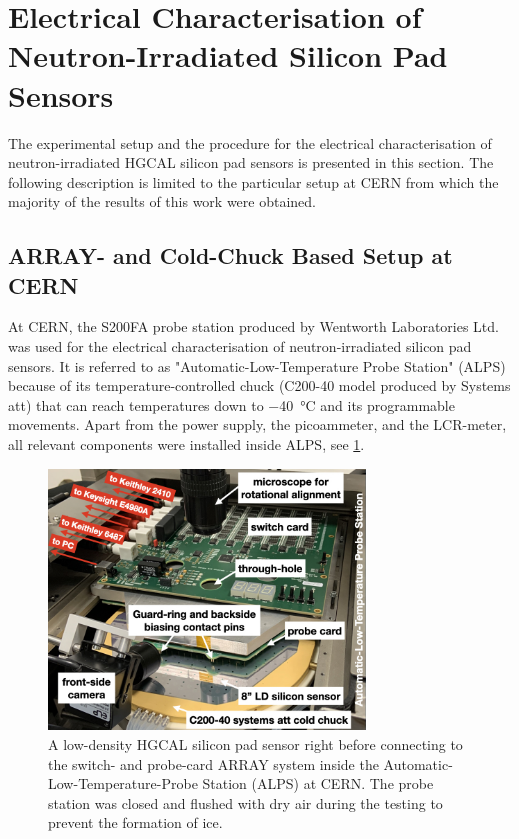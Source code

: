 \section{Electrical Characterisation of Neutron-Irradiated Silicon Pad Sensors}
\label{sec:setup}
The experimental setup and the procedure for the electrical characterisation of neutron-irradiated HGCAL silicon pad sensors is presented in this section.
The following description is limited to the particular setup at CERN from which the majority of the results of this work were obtained.

\subsection{ARRAY- and Cold-Chuck Based Setup at CERN}
\label{subsec:setup_alps}
At CERN, the S200FA probe station produced by Wentworth Laboratories Ltd. was used for the electrical characterisation of neutron-irradiated silicon pad sensors. 
It is referred to as "Automatic-Low-Temperature Probe Station" (ALPS) because of its temperature-controlled chuck (C200-40 model produced by Systems att) that can reach temperatures down to \SI{-40}{\celsius} and its programmable movements.
Apart from the power supply, the picoammeter, and the LCR-meter, all relevant components were installed inside ALPS, see \ref{fig:ALPS_setup}.
\begin{figure}[h]
	\centering
	\includegraphics[width=0.75\textwidth]{figures/ALPS_photo_edit.jpeg}
	\caption{
		A low-density HGCAL silicon pad sensor right before connecting to the switch- and probe-card ARRAY system inside the Automatic-Low-Temperature-Probe Station (ALPS) at CERN.
		The probe station was closed and flushed with dry air during the testing to prevent the formation of ice.
		}
		\label{fig:ALPS_setup}
	\end{figure}
